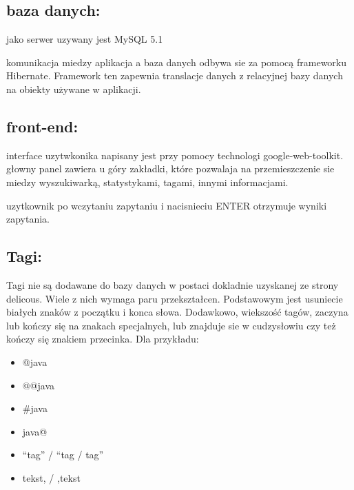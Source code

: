 \subsection*{baza danych:}
jako serwer uzywany jest MySQL 5.1

komunikacja miedzy aplikacja a baza danych odbywa sie za pomocą frameworku Hibernate. Framework ten zapewnia translacje danych z relacyjnej bazy danych na obiekty używane w aplikacji.


\subsection*{front-end:}
interface uzytwkonika napisany jest przy pomocy technologi google-web-toolkit.
głowny panel zawiera u góry zakładki, które pozwalaja na przemieszczenie sie miedzy wyszukiwarką, statystykami, tagami, innymi informacjami.

uzytkownik po wczytaniu zapytaniu i nacisnieciu ENTER otrzymuje wyniki zapytania.


\subsection*{Tagi:}
Tagi nie są dodawane do bazy danych w postaci dokladnie uzyskanej ze strony delicous. Wiele z nich wymaga paru przekształcen. Podstawowym jest usuniecie białych znaków z początku i konca słowa. Dodawkowo, wiekszość tagów, zaczyna lub kończy się na znakach specjalnych, lub znajduje sie w cudzysłowiu czy też kończy się znakiem przecinka. Dla przykładu:

\begin{itemize} 
    \item @java
    \item  @@java
    \item  \#java
    \item  java@
    \item  “tag” / “tag / tag”
    \item  tekst, / ,tekst
\end{itemize}



